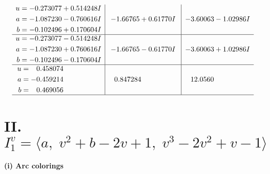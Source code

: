 \documentclass[1p]{elsarticle_modified}
\theoremstyle{definition}
\begin{document}
$$\begin{array}{c|c|c}
\begin{aligned}
u &= -0.273077 + 0.514248 I \\
a &= -1.087230 - 0.760616 I \\
b &= -0.102496 + 0.170604 I\end{aligned}
 & -1.66765 + 0.61770 I & -3.60063 - 1.02986 I \\ \hline\begin{aligned}
u &= -0.273077 - 0.514248 I \\
a &= -1.087230 + 0.760616 I \\
b &= -0.102496 - 0.170604 I\end{aligned}
 & -1.66765 - 0.61770 I & -3.60063 + 1.02986 I \\ \hline\begin{aligned}
u &= \phantom{-}0.458074\phantom{ +0.000000I} \\
a &= -0.459214\phantom{ +0.000000I} \\
b &= \phantom{-}0.469056\phantom{ +0.000000I}\end{aligned}
 & \phantom{-}0.847284\phantom{ +0.000000I} & \phantom{-}12.0560\phantom{ +0.000000I}\\
 \hline 
 \end{array}$$\newpage\newpage\renewcommand{\arraystretch}{1}
\centering \section*{II. $I^v_{1}= \langle a,\;v^2+b-2 v+1,\;v^3-2 v^2+v-1 \rangle$}
\flushleft \textbf{(i) Arc colorings}\\
\end{document}
